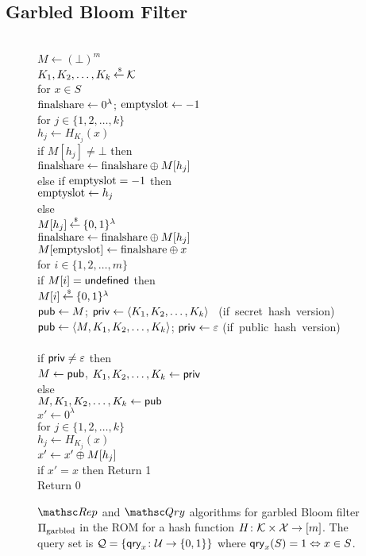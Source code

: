 \subsection{Garbled Bloom Filter}
\begin{figure}
\centering
{}
{
\\
$M \gets (\bot)^m$\\
$K_1,K_2,\ldots, K_k {\:\stackrel{{\scriptscriptstyle \hspace{0.2em}\$}} {\leftarrow}\:} {\cal K}$\\
for $x \in S$\\
\nudge $\mathrm{finalshare} \gets 0^\lambda$; $\mathrm{emptyslot} \gets -1$\\
\nudge for $j \in \{1,2,\ldots, k\}$\\
\nudge \nudge $h_j \gets H_{K_j}(x)$\\
\nudge \nudge if $M[h_j] \neq \bot$ then\\
\nudge \nudge \nudge $\mathrm{finalshare} \gets \mathrm{finalshare} {\:\oplus\:} M[h_j]$\\
\nudge \nudge else if $\mathrm{emptyslot} = -1$ then\\
\nudge \nudge \nudge $\mathrm{emptyslot} \gets h_j$\\
\nudge \nudge else\\
\nudge \nudge \nudge $M[h_j] {\:\stackrel{{\scriptscriptstyle \hspace{0.2em}\$}} {\leftarrow}\:} \{0,1\}^\lambda$\\
\nudge \nudge \nudge $\mathrm{finalshare} \gets \mathrm{finalshare} {\:\oplus\:} M[h_j]$\\
\nudge $M[\mathrm{emptyslot}] \gets \mathrm{finalshare} {\:\oplus\:} x$\\
for $i \in \{1,2,\ldots, m\}$\\
\nudge if $M[i] = \mathsf{undefined}$ then\\
\nudge \nudge  $M[i] {\:\stackrel{{\scriptscriptstyle \hspace{0.2em}\$}} {\leftarrow}\:} \{0,1\}^\lambda$\\
${\sf pub} \gets M$; ${\sf priv} \gets \langle K_1,K_2,\ldots,K_k \rangle$ \mbox{ (if secret hash version)}\\
${\sf pub} \gets \langle M,K_1,K_2,\ldots,K_k \rangle$; ${\sf priv} \gets \varepsilon$ \mbox{(if public hash version)}\\

\medskip
{}\\
if ${\sf priv} \neq \varepsilon$ then\\
\nudge $M \gets {\sf pub}$, $K_1,K_2,\ldots,K_k \gets {\sf priv}$\\
else\\
\nudge $M,K_1,K_2,\ldots,K_k \gets {\sf pub}$\\
$x' \gets 0^\lambda$\\
for $j \in \{1,2,\dots,k\}$\\
\nudge $h_j \gets H_{K_j}(x)$\\
\nudge $x' \gets x' {\:\oplus\:} M[h_j]$\\
if $x' =x $ then Return 1\\
Return 0
}
\caption{ $\Rep$ and $\Qry$ algorithms for garbled Bloom
  filter $\Pi_{\mathrm{garbled}}$ in the ROM for a hash function $H\colon {\cal K} \times 
 {\cal X} \to [m]$. The query set is ${\cal Q}=\{\mathsf{qry}_x\colon
  {\cal U} \to \{0,1\}\}$ where $\mathsf{qry}_x(S)=1 \Leftrightarrow x \in S$.}

\end{figure}


